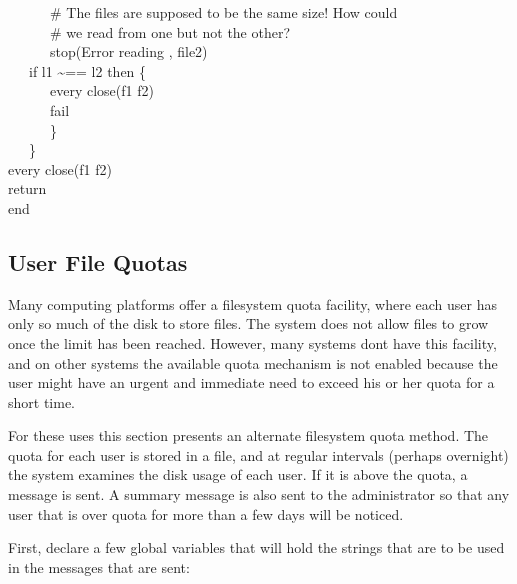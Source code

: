 {\>   \ \ \ \ \ \ \# The files are supposed to be the same size! How
could \\
\>   \ \ \ \ \ \ \# we read from one but not the other? \\
\>   \ \ \ \ \ \ stop({\textquotedbl}Error reading {\textquotedbl},
file2) \\
\>   \ \ \ if l1 \~{}== l2 then \{ \\
\>   \ \ \ \ \ \ every close(f1 {\textbar} f2) \\
\>   \ \ \ \ \ \ fail \\
\>   \ \ \ \ \ \ \} \\
\>   \ \ \ \} \\
\>   every close(f1 {\textbar} f2) \\
\>   return \\
end
}

\subsection{User File Quotas}

Many computing platforms offer a filesystem quota facility,
where each user has only so much of the disk to store files. The
system does not allow files to grow once the
limit has been reached. However, many systems don{\textquotesingle}t
have this facility, and on other systems the available quota mechanism
is not enabled because the user might have an urgent and immediate need
to exceed his or her quota for a short time.

For these uses this section presents an alternate filesystem quota
method. The quota for each user is stored in a file, and at regular
intervals (perhaps overnight) the system examines the disk usage of
each user. If it is above the quota, a message is sent. A summary
message is also sent to the administrator so that any user that is over
quota for more than a few days will be noticed.

First, declare a few global variables that will hold the strings that
are to be used in the messages that are sent: 


